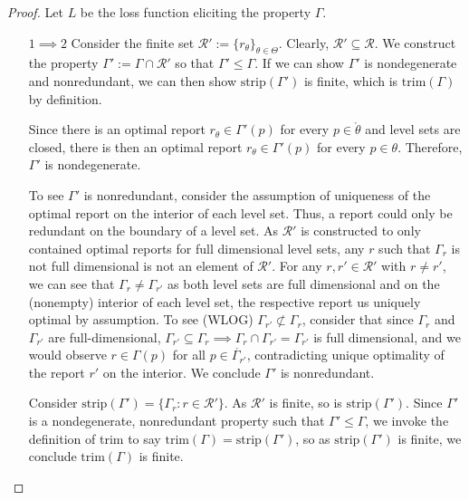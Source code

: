 \documentclass[12pt]{article}
\newcommand{\R}{\mathcal{R}}
\newcommand{\inter}[1]{\mathring{#1}}%
\newcommand{\trim}{\mathrm{trim}}
\newcommand{\strip}{\text{strip}}
\begin{document}
\begin{proof}
Let $L$ be the loss function eliciting the property $\Gamma$.

\begin{enumerate}
\item [$1 \implies 2$]
Consider the finite set $\R' := \{r_\theta\}_{\theta \in \Theta}$.
Clearly, $\R' \subseteq \R$.
We construct the property $\Gamma' := \Gamma \cap \R'$ so that $\Gamma' \leq \Gamma$.
If we can show $\Gamma'$ is nondegenerate and nonredundant, we can then show $\strip(\Gamma')$ is finite, which is $\trim(\Gamma)$ by definition.

Since there is an optimal report $r_\theta \in \Gamma'(p)$ for every $p \in \inter{\theta}$ and level sets are closed, there is then an optimal report $r_\theta \in \Gamma'(p)$ for every $p \in \theta$.
Therefore, $\Gamma'$ is nondegenerate.

To see $\Gamma'$ is nonredundant, consider the assumption of uniqueness of the optimal report on the interior of each level set.
Thus, a report could only be redundant on the boundary of a level set.
As $\R'$ is constructed to only contained optimal reports for full dimensional level sets, any $r$ such that $\Gamma_r$ is not full dimensional is not an element of $\R'$.
For any $r, r' \in \R'$ with $r \neq r'$, we can see that $\Gamma_r \neq \Gamma_{r'}$ as both level sets are full dimensional and  on the (nonempty) interior of each level set, the respective report us uniquely optimal by assumption.
To see (WLOG) $\Gamma_{r'} \not \subset \Gamma_r$, consider that since $\Gamma_r$ and $\Gamma_{r'}$ are full-dimensional, $\Gamma_{r'} \subseteq \Gamma_r \implies \Gamma_r \cap \Gamma_{r'} = \Gamma_{r'}$ is full dimensional, and we would observe $ r \in \Gamma(p)$ for all $p \in \inter{\Gamma_{r'}}$, contradicting unique optimality of the report $r'$ on the interior. 
We conclude $\Gamma'$ is nonredundant.


Consider $\strip(\Gamma') = \{\Gamma_r : r \in \R' \}$.
As $\R'$ is finite, so is $\strip(\Gamma')$.
Since $\Gamma'$ is a  nondegenerate, nonredundant property such that $\Gamma' \leq \Gamma$, we invoke the definition of trim to say $\trim(\Gamma) = \strip(\Gamma')$, so as $\strip(\Gamma')$ is finite, we conclude $\trim(\Gamma)$ is finite.



\end{enumerate}
\end{proof}
\end{document}
